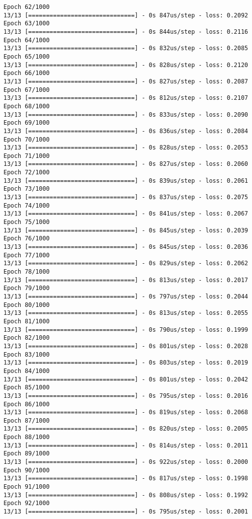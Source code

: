 \documentclass[11pt]{article}
\begin{document}
\begin{Verbatim}[commandchars=\\\{\}]
Epoch 62/1000
13/13 [==============================] - 0s 847us/step - loss: 0.2092
Epoch 63/1000
13/13 [==============================] - 0s 844us/step - loss: 0.2116
Epoch 64/1000
13/13 [==============================] - 0s 832us/step - loss: 0.2085
Epoch 65/1000
13/13 [==============================] - 0s 828us/step - loss: 0.2120
Epoch 66/1000
13/13 [==============================] - 0s 827us/step - loss: 0.2087
Epoch 67/1000
13/13 [==============================] - 0s 812us/step - loss: 0.2107
Epoch 68/1000
13/13 [==============================] - 0s 833us/step - loss: 0.2090
Epoch 69/1000
13/13 [==============================] - 0s 836us/step - loss: 0.2084
Epoch 70/1000
13/13 [==============================] - 0s 828us/step - loss: 0.2053
Epoch 71/1000
13/13 [==============================] - 0s 827us/step - loss: 0.2060
Epoch 72/1000
13/13 [==============================] - 0s 839us/step - loss: 0.2061
Epoch 73/1000
13/13 [==============================] - 0s 837us/step - loss: 0.2075
Epoch 74/1000
13/13 [==============================] - 0s 841us/step - loss: 0.2067
Epoch 75/1000
13/13 [==============================] - 0s 845us/step - loss: 0.2039
Epoch 76/1000
13/13 [==============================] - 0s 845us/step - loss: 0.2036
Epoch 77/1000
13/13 [==============================] - 0s 829us/step - loss: 0.2062
Epoch 78/1000
13/13 [==============================] - 0s 813us/step - loss: 0.2017
Epoch 79/1000
13/13 [==============================] - 0s 797us/step - loss: 0.2044
Epoch 80/1000
13/13 [==============================] - 0s 813us/step - loss: 0.2055
Epoch 81/1000
13/13 [==============================] - 0s 790us/step - loss: 0.1999
Epoch 82/1000
13/13 [==============================] - 0s 801us/step - loss: 0.2028
Epoch 83/1000
13/13 [==============================] - 0s 803us/step - loss: 0.2019
Epoch 84/1000
13/13 [==============================] - 0s 801us/step - loss: 0.2042
Epoch 85/1000
13/13 [==============================] - 0s 795us/step - loss: 0.2016
Epoch 86/1000
13/13 [==============================] - 0s 819us/step - loss: 0.2068
Epoch 87/1000
13/13 [==============================] - 0s 820us/step - loss: 0.2005
Epoch 88/1000
13/13 [==============================] - 0s 814us/step - loss: 0.2011
Epoch 89/1000
13/13 [==============================] - 0s 922us/step - loss: 0.2000
Epoch 90/1000
13/13 [==============================] - 0s 817us/step - loss: 0.1998
Epoch 91/1000
13/13 [==============================] - 0s 808us/step - loss: 0.1992
Epoch 92/1000
13/13 [==============================] - 0s 795us/step - loss: 0.2001

\end{Verbatim}
\end{document}

